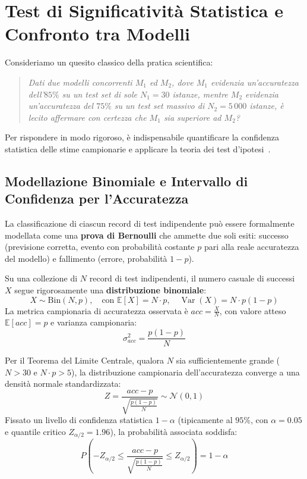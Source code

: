 \FloatBarrier
\section{Test di Significatività Statistica e Confronto tra Modelli}
\label{sec:dm-statistical-comparison}

Consideriamo un quesito classico della pratica scientifica:
\begin{quote}
\textit{Dati due modelli concorrenti $M_1$ ed $M_2$, dove $M_1$ evidenzia un'accuratezza dell'$85\%$ su un test set di sole $N_1 = 30$ istanze, mentre $M_2$ evidenzia un'accuratezza del $75\%$ su un test set massivo di $N_2 = 5\,000$ istanze, è lecito affermare con certezza che $M_1$ sia superiore ad $M_2$?}
\end{quote}

Per rispondere in modo rigoroso, è indispensabile quantificare la confidenza statistica delle stime campionarie e applicare la teoria dei test d'ipotesi~\cite{tan2018}.

\FloatBarrier
\subsection{Modellazione Binomiale e Intervallo di Confidenza per l'Accuratezza}
\label{subsec:dm-binomial-confidence-interval}

La classificazione di ciascun record di test indipendente può essere formalmente modellata come una \textbf{prova di Bernoulli} che ammette due soli esiti: successo (previsione corretta, evento con probabilità costante $p$ pari alla reale accuratezza del modello) e fallimento (errore, probabilità $1 - p$).

Su una collezione di $N$ record di test indipendenti, il numero casuale di successi $X$ segue rigorosamente una \textbf{distribuzione binomiale}:
\begin{equation}
    X \sim \text{Bin}(N, p), \quad \text{con } \mathbb{E}[X] = N \cdot p, \quad \operatorname{Var}(X) = N \cdot p (1 - p)
\end{equation}
La metrica campionaria di accuratezza osservata è $acc = \frac{X}{N}$, con valore atteso $\mathbb{E}[acc] = p$ e varianza campionaria:
\begin{equation}
    \sigma_{acc}^2 = \frac{p(1 - p)}{N}
\end{equation}

Per il Teorema del Limite Centrale, qualora $N$ sia sufficientemente grande ($N > 30$ e $N \cdot p > 5$), la distribuzione campionaria dell'accuratezza converge a una densità normale standardizzata:
\begin{equation}
    Z = \frac{acc - p}{\sqrt{\frac{p(1 - p)}{N}}} \sim \mathcal{N}(0, 1)
\end{equation}
Fissato un livello di confidenza statistica $1 - \alpha$ (tipicamente al $95\%$, con $\alpha = 0.05$ e quantile critico $Z_{\alpha/2} = 1.96$), la probabilità associata soddisfa:
\begin{equation}
    P\left( -Z_{\alpha/2} \le \frac{acc - p}{\sqrt{\frac{p(1 - p)}{N}}} \le Z_{\alpha/2} \right) = 1 - \alpha
\end{equation}

